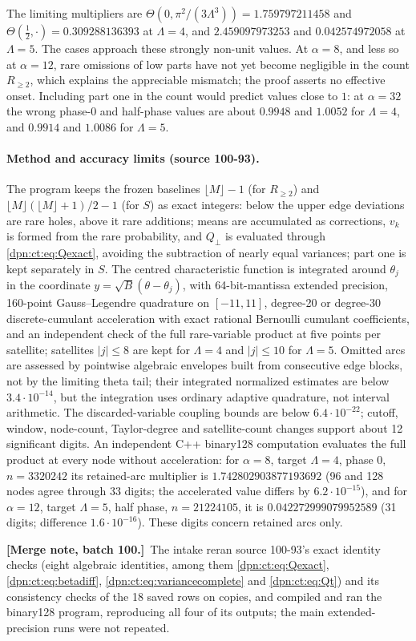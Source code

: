 \documentclass[11pt]{article}
\numberwithin{equation}{section}
\theoremstyle{definition}\newtheorem{definition}[theorem]{Definition}
\theoremstyle{remark}\newtheorem{remark}[theorem]{Remark}
\newcommand{\src}[1]{\textup{(source #1)}}
\newcommand{\mergenoted}[1]{\par\smallskip\noindent\textbf{[Merge note, batch 100.]}\ #1\par\smallskip}
\begin{document}
The limiting multipliers are $\Theta(0,\pi^2/(3\Lambda^3))=1.759797211458$ and
$\Theta(\frac12,\cdot)=0.309288136393$ at $\Lambda=4$, and $2.459097973253$ and
$0.042574972058$ at $\Lambda=5$.  The cases approach these strongly non-unit
values.  At $\alpha=8$, and less so at $\alpha=12$, rare omissions of low parts
have not yet become negligible in the count $R_{\ge2}$, which explains the
appreciable mismatch; the proof asserts no effective onset.  Including part
one in the count would predict values close to $1$: at $\alpha=32$ the wrong
phase-$0$ and half-phase values are about $0.9948$ and $1.0052$ for $\Lambda=4$,
and $0.9914$ and $1.0086$ for $\Lambda=5$.

\paragraph{Method and accuracy limits \src{100-93}.}
The program keeps the frozen baselines $\lfloor M\rfloor-1$ (for $R_{\ge2}$) and
$\lfloor M\rfloor(\lfloor M\rfloor+1)/2-1$ (for $S$) as exact integers: below the
upper edge deviations are rare holes, above it rare additions; means are
accumulated as corrections, $v_k$ is formed from the rare probability, and
$Q_\perp$ is evaluated through \eqref{dpn:ct:eq:Qexact}, avoiding the
subtraction of nearly equal variances; part one is kept separately in $S$.
The centred characteristic function is integrated around $\theta_j$ in the
coordinate $y=\sqrt B(\theta-\theta_j)$, with 64-bit-mantissa extended precision,
160-point Gauss--Legendre quadrature on $[-11,11]$, degree-20 or degree-30
discrete-cumulant acceleration with exact rational Bernoulli cumulant
coefficients, and an independent check of the full rare-variable product at
five points per satellite; satellites $|j|\le8$ are kept for $\Lambda=4$ and
$|j|\le10$ for $\Lambda=5$.  Omitted arcs are assessed by pointwise algebraic
envelopes built from consecutive edge blocks, not by the limiting theta tail;
their integrated normalized estimates are below $3.4\cdot10^{-14}$, but the
integration uses ordinary adaptive quadrature, not interval arithmetic.  The
discarded-variable coupling bounds are below $6.4\cdot10^{-22}$; cutoff,
window, node-count, Taylor-degree and satellite-count changes support about
12 significant digits.  An independent C++ binary128 computation evaluates
the full product at every node without acceleration: for $\alpha=8$, target
$\Lambda=4$, phase $0$, $n=3320242$ its retained-arc multiplier is
$1.742802903877193692$ (96 and 128 nodes agree through 33 digits; the
accelerated value differs by $6.2\cdot10^{-15}$), and for $\alpha=12$, target
$\Lambda=5$, half phase, $n=21224105$, it is $0.042272999079952589$ (31 digits;
difference $1.6\cdot10^{-16}$).  These digits concern retained arcs only.
\mergenoted{The intake reran source 100-93's exact identity checks (eight
algebraic identities, among them \eqref{dpn:ct:eq:Qexact},
\eqref{dpn:ct:eq:betadiff}, \eqref{dpn:ct:eq:variancecomplete} and
\eqref{dpn:ct:eq:Qt}) and its consistency checks of the 18 saved rows on
copies, and compiled and ran the binary128 program, reproducing all four of
its outputs; the main extended-precision runs were not repeated.}
\end{document}
